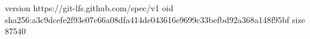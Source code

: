 version https://git-lfs.github.com/spec/v1
oid sha256:a3c9dcefe2f93e07c66a08dfa414de043616e9699c33befbd92a368a148f95bf
size 87540
